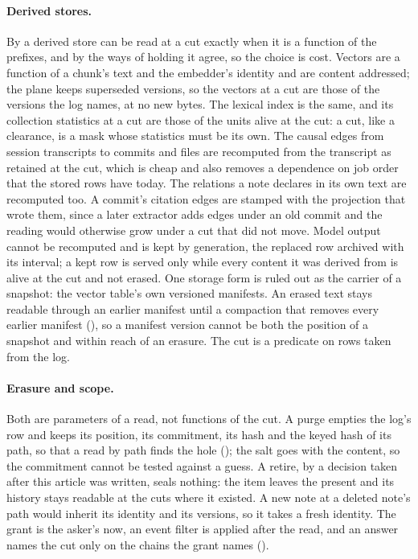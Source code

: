 \documentclass[11pt]{article}
\theoremstyle{plain}
\theoremstyle{definition}
\begin{document}
\paragraph{Derived stores.}
By  a derived store can be read at a cut exactly when it is a function of the
prefixes, and by  the ways of holding it agree, so the choice is cost. Vectors
are a function of a chunk's text and the embedder's identity and are content addressed; the
plane keeps superseded versions, so the vectors at a cut are those of the versions the log names,
at no new bytes. The lexical index is the same, and its collection statistics
\cite{robertson2009bm25} at a cut are those of the units alive at the cut: a cut, like a
clearance, is a mask whose statistics must be its own. The causal edges from session transcripts
to commits and files are recomputed from the transcript as retained at the cut, which is cheap
and also removes a dependence on job order that the stored rows have today. The relations a note
declares in its own text are recomputed too. A commit's citation edges are stamped with the
projection that wrote them, since a later extractor adds edges under an old commit and the
reading would otherwise grow under a cut that did not move. Model output cannot be recomputed
and is kept by generation, the replaced row archived with its interval; a kept row is served
only while every content it was derived from is alive at the cut and not erased. One storage form is
ruled out as the carrier of a snapshot: the vector table's own versioned manifests. An erased
text stays readable through an earlier manifest until a compaction that removes every earlier
manifest (), so a manifest version cannot be both the position of a snapshot and
within reach of an erasure. The cut is a predicate on rows taken from the log.

\paragraph{Erasure and scope.}
Both are parameters of a read, not functions of the cut. A purge empties the log's row and keeps
its position, its commitment, its hash and the keyed hash of its path, so that a read by path
finds the hole (); the salt goes with the content, so the commitment
cannot be tested against a guess. A retire, by a decision taken after this article was written,
seals nothing: the item leaves the present and its history stays readable at the cuts where it
existed. A new note at a deleted note's path would inherit its identity and its versions, so it
takes a fresh identity. The grant is the asker's now, an event filter is applied after the read,
and an answer names the cut only on the chains the grant names ().
\end{document}
